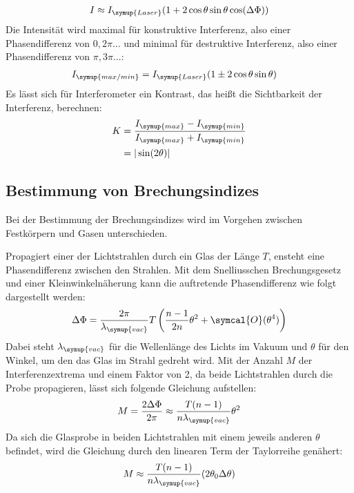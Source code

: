 \begin{align}
    I \approx I_{\symup{Laser}}(1+2\cos\theta\sin\theta\cos(\Delta\Phi))
\end{align}
Die Intensit\"at wird maximal f\"ur konstruktive Interferenz, also einer Phasendifferenz von $0,2\pi...$ und minimal f\"ur destruktive Interferenz, also einer
Phasendifferenz von $\pi,3\pi...$:
\begin{align}
    I_{\symup{max/min}} &= I_{\symup{Laser}}(1\pm 2\cos\theta\sin\theta)
\end{align}
Es l\"asst sich f\"ur Interferometer ein Kontrast, das heißt die Sichtbarkeit der Interferenz, berechnen:
\begin{align}
    K &= \frac{I_{\symup{max}} - I_{\symup{min}}}{I_{\symup{max}} + I_{\symup{min}}}\\
      &= |\sin(2\theta)|
    \label{eq:kontrast}
\end{align}

\subsection{Bestimmung von Brechungsindizes}

Bei der Bestimmung der Brechungsindizes wird im Vorgehen zwischen Festk\"orpern und Gasen unterschieden.

Propagiert einer der Lichtstrahlen durch ein Glas der L\"ange $T$, ensteht eine Phasendifferenz zwischen den Strahlen.
Mit dem Snelliusschen Brechungsgesetz und einer Kleinwinkeln\"aherung kann die auftretende Phasendifferenz  wie
folgt dargestellt werden:
\begin{align}
    \Delta \Phi = \frac{2\pi}{\lambda_{\symup{vac}}}T\left(\frac{n-1}{2n}\theta^2+\symcal{O}(\theta^4)\right)
\end{align}
Dabei steht $\lambda_{\symup{vac}}$ f\"ur die Wellenl\"ange des Lichts im Vakuum und $\theta$ f\"ur den Winkel, um den das Glas im Strahl gedreht wird. Mit der Anzahl $M$ der Interferenzextrema und einem Faktor von 2, da beide Lichtstrahlen durch die Probe propagieren,
l\"asst sich folgende Gleichung aufstellen:
\begin{align}
    M = \frac{2\Delta\Phi}{2\pi} \approx \frac{T(n-1)}{n\lambda_{\symup{vac}}}\theta^2
\end{align}
Da sich die Glasprobe in beiden Lichtstrahlen mit einem jeweils anderen $\theta$ befindet, wird die Gleichung durch den linearen Term der Taylorreihe gen\"ahert:
\begin{align}
    M \approx \frac{T(n-1)}{n\lambda_{\symup{vac}}}(2\theta_0\Delta\theta)
\end{align}

